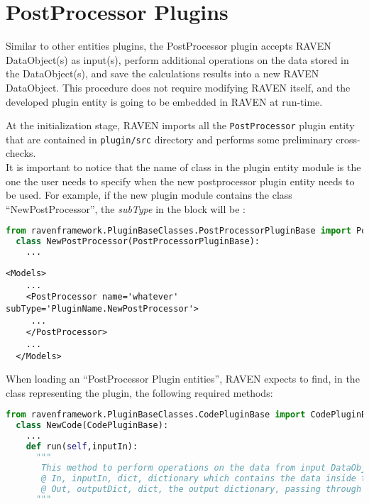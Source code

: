 \section{PostProcessor Plugins}
\label{sec:postprocessorPlugins}

Similar to other entities plugins, the PostProcessor plugin accepts RAVEN DataObject(s) as input(s),
perform additional operations on the data stored in the DataObject(s), and save the calculations
results into a new RAVEN DataObject. This procedure does not require modifying RAVEN itself, and the
developed plugin entity is going to be embedded in RAVEN at run-time.

At the initialization stage, RAVEN imports all the \texttt{PostProcessor} plugin entity that are contained in
\texttt{plugin/src} directory and performs some preliminary cross-checks.
\\It is important to notice that the name of class in the plugin entity module is the one
the user needs to specify when the new postprocessor plugin entity needs to be used.
For example, if the new plugin module contains the class ``NewPostProcessor'',
the \textit{subType} in the  block will be :
\begin{lstlisting}[language=python, basicstyle=\scriptsize\ttfamily, breaklines=True, columns=fullflexible]
  from ravenframework.PluginBaseClasses.PostProcessorPluginBase import PostProcessorPluginBase
  class NewPostProcessor(PostProcessorPluginBase):
    ...
\end{lstlisting}
\begin{lstlisting}[style=XML,morekeywords={name,file}] %moreemph={name,file}]
  <Models>
    ...
    <PostProcessor name='whatever' subType='PluginName.NewPostProcessor'>
     ...
    </PostProcessor>
    ...
  </Models>
\end{lstlisting}

When loading an ``PostProcessor Plugin entities'', RAVEN expects to find, in the class
representing the plugin, the following required methods:
\begin{lstlisting}[language=python, basicstyle=\scriptsize\ttfamily, breaklines=True, columns=fullflexible]
  from ravenframework.PluginBaseClasses.CodePluginBase import CodePluginBase
  class NewCode(CodePluginBase):
    ...
    def run(self,inputIn):
      """
       This method to perform operations on the data from input DataObject(s)
       @ In, inputIn, dict, dictionary which contains the data inside the input DataObject
       @ Out, outputDict, dict, the output dictionary, passing through HistorySet info
      """
\end{lstlisting}

